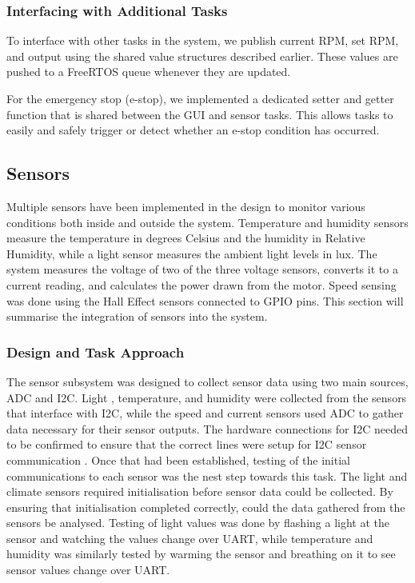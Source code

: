 \documentclass[a4paper, 11pt, titlepage]{article}
\begin{document}
\subsubsection{Interfacing with Additional Tasks}
To interface with other tasks in the system, we publish current RPM, set RPM, and output using the shared value structures described earlier. These values are pushed to a FreeRTOS queue whenever they are updated. 

For the emergency stop (e-stop), we implemented a dedicated setter and getter function that is shared between the GUI and sensor tasks. This allows tasks to easily and safely trigger or detect whether an e-stop condition has occurred.


\newpage
\subsection{Sensors}
Multiple sensors have been implemented in the design to monitor various conditions both inside and outside the system. Temperature and humidity sensors measure the temperature in degrees Celsius and the humidity in Relative Humidity, while a light sensor measures the ambient light levels in lux. The system measures the voltage of two of the three voltage sensors, converts it to a current reading, and calculates the power drawn from the motor. Speed sensing was done using the Hall Effect sensors connected to GPIO pins. This section will summarise the integration of sensors into the system.

\subsubsection{Design and Task Approach}
The sensor subsystem was designed to collect sensor data using two main sources, ADC and I2C. Light \parencite{opt3001}, temperature, and humidity were collected from the sensors that interface with I2C, while the speed and current sensors used ADC to gather data necessary for their sensor outputs. The hardware connections for I2C needed to be confirmed to ensure that the correct lines were setup for I2C sensor communication \parencite{boosterpack}. Once that had been established, testing of the initial communications to each sensor was the nest step towards this task. The light and climate sensors required initialisation before sensor data could be collected. By ensuring that initialisation completed correctly, could the data gathered from the sensors be analysed. Testing of light values was done by flashing a light at the sensor and watching the values change over UART, while temperature and humidity was similarly tested by warming the sensor and breathing on it to see sensor values change over UART.\\
\end{document}
